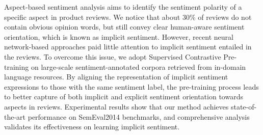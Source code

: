 Aspect-based sentiment analysis aims to identify the sentiment polarity of a specific aspect in product reviews. We notice that about 30\% of reviews do not contain obvious opinion words, but still convey clear human-aware sentiment orientation, which is known as implicit sentiment. However, recent neural network-based approaches paid little attention to implicit sentiment entailed in the reviews. To overcome this issue, we adopt Supervised Contrastive Pre-training on large-scale sentiment-annotated corpora retrieved from in-domain language resources. By aligning the representation of implicit sentiment expressions to those with the same sentiment label, the pre-training process leads to better capture of both implicit and explicit sentiment orientation towards aspects in reviews. Experimental results show that our method achieves state-of-the-art performance on SemEval2014 benchmarks, and comprehensive analysis validates its effectiveness on learning implicit sentiment.
